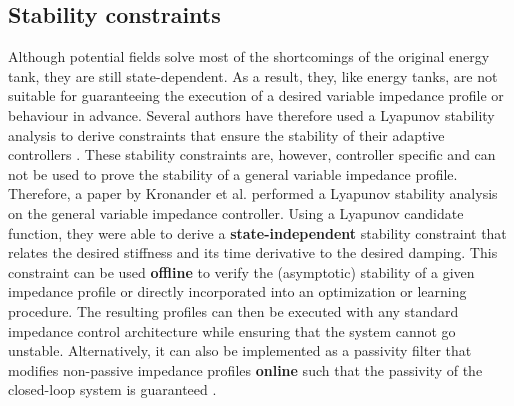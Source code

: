 \subsection{Stability constraints}

Although potential fields solve most of the shortcomings of the original energy tank, they are still state-dependent. As a result, they, like energy tanks, are not suitable for guaranteeing the execution of a desired variable impedance profile or behaviour in advance. Several authors have therefore used a Lyapunov stability analysis to derive constraints that ensure the stability of their adaptive controllers \cite{leeForceTrackingImpedance2008,linUnifiedMotionForce2021,maFractionalorderSlidingMode2019,maVariableStiffnessDamping2019,sunModelReferenceAdaptive2021,yangHumanlikeAdaptationForce2011,wahballaConstantForceTracking2022,liForceImpedanceTrajectory2018,hamedaniIntelligentImpedanceControl2021,hamedaniRecurrentFuzzyWavelet2021,ganeshVersatileBiomimeticController2012}. These stability constraints are, however, controller specific and can not be used to prove the stability of a general variable impedance profile. Therefore, a paper by Kronander et al. \cite{kronanderStabilityConsiderationsVariable2016} performed a Lyapunov stability analysis on the general variable impedance controller. Using a Lyapunov candidate function, they were able to derive a \textbf{state-independent} stability constraint that relates the desired stiffness and its time derivative to the desired damping. This constraint can be used \textbf{offline} to verify the (asymptotic) stability of a given impedance profile or directly incorporated into an optimization or learning procedure. The resulting profiles can then be executed with any standard impedance control architecture while ensuring that the system cannot go unstable. Alternatively, it can also be implemented as a passivity filter that modifies non-passive impedance profiles \textbf{online} such that the passivity of the closed-loop system is guaranteed \cite{bednarczykPassivityFilterVariable2020}.

